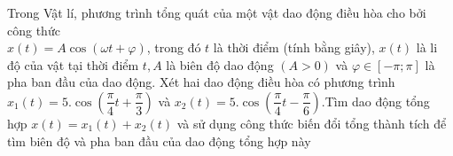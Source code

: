 \begin{ex}%
	
	Trong Vật lí, phương trình tổng quát của một vật dao động điều hòa cho bởi công thức\\ $x\left( t \right)=A\cos \left( \omega t+\varphi \right)$, trong đó $t$ là thời điểm (tính bằng giây), $x\left( t \right)$ là li độ của vật tại thời điểm $t,A$ là biên độ dao động $\left( A>0 \right)$ và $\varphi \in \left[ -\pi ;\pi \right]$ là pha ban đầu của dao động. Xét hai dao động điều hòa có phương trình ${x_1}\left( t \right)=5.\cos \left( \dfrac{\pi }{4}t+\dfrac{\pi }{3} \right)$ và ${x_2}\left( t \right)=5.\cos \left( \dfrac{\pi }{4}t-\dfrac{\pi }{6} \right)$.Tìm dao động tổng hợp $x\left( t \right)=x_1\left( t \right)+x_2\left( t \right)$ và sử dụng công thức biến đổi tổng thành tích để tìm biên độ và pha ban đầu của dao động tổng hợp này
\end{ex}

